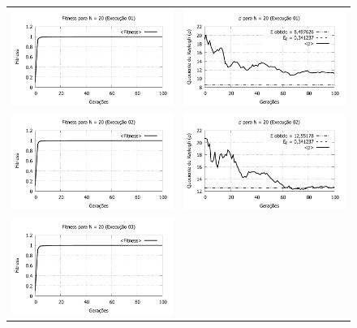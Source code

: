 \newpage
\begin{figure}[p]
\centering
  \begin{tabular}{@{}cc@{}}
    \includegraphics[width=.45\textwidth]{figs/resultados/fitnessGrad/N20_01_fitness.pdf} &
    \includegraphics[width=.45\textwidth]{figs/resultados/fitnessGrad/N20_01_rho.pdf}   \\
		\includegraphics[width=.45\textwidth]{figs/resultados/fitnessGrad/N20_02_fitness.pdf} &
    \includegraphics[width=.45\textwidth]{figs/resultados/fitnessGrad/N20_02_rho.pdf}   \\
		\includegraphics[width=.45\textwidth]{figs/resultados/fitnessGrad/N20_03_fitness.pdf} &

\end{tabular}
\end{figure}
